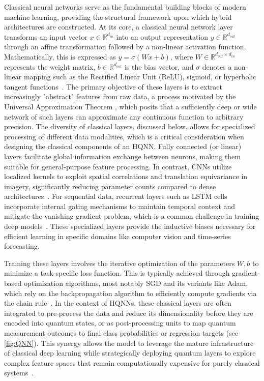 \documentclass[aps,10pt,groupedaddress,prx,superscriptaddress,twocolumn,balancelastpage, tightenlines]{revtex4-2}
\theoremstyle{plain}  %
\begin{document}
Classical neural networks serve as the fundamental building blocks of modern machine learning, providing the structural framework upon which hybrid architectures are constructed. At its core, a classical neural network layer transforms an input vector $x \in \mathbb{R}^{d_{in}}$ into an output representation $y \in \mathbb{R}^{d_{out}}$ through an affine transformation followed by a non-linear activation function. Mathematically, this is expressed as $y = \sigma(Wx + b)$, where $W \in \mathbb{R}^{d_{out} \times d_{in}}$ represents the weight matrix, $b \in \mathbb{R}^{d_{out}}$ is the bias vector, and $\sigma$ denotes a non-linear mapping such as the Rectified Linear Unit (ReLU), sigmoid, or hyperbolic tangent functions~\cite{goodfellow2016deep}. 
The primary objective of these layers is to extract increasingly "abstract" features from raw data, a process motivated by the Universal Approximation Theorem \cite{hornik1989multilayer}, which posits that a sufficiently deep or wide network of such layers can approximate any continuous function to arbitrary precision. The diversity of classical layers, discussed below, allows for specialized processing of different data modalities, which is a critical consideration when designing the classical components of an HQNN. Fully connected (or linear) layers facilitate global information exchange between neurons, making them suitable for general-purpose feature processing. In contrast, \glspl{CNN} utilize localized kernels to exploit spatial correlations and translation equivariance in imagery, significantly reducing parameter counts compared to dense architectures~\cite{lecun1998mnist, he2016resnet}. For sequential data, recurrent layers such as \gls{LSTM} cells incorporate internal gating mechanisms to maintain temporal context and mitigate the vanishing gradient problem, which is a common challenge in training deep models~\cite{hochreiter1997lstm}. These specialized layers provide the inductive biases necessary for efficient learning in specific domains like computer vision and time-series forecasting.



Training these layers involves the iterative optimization of the parameters $W, b$ to minimize a task-specific loss function. This is typically achieved through gradient-based optimization algorithms, most notably \gls{SGD} and its variants like Adam, which rely on the backpropagation algorithm to efficiently compute gradients via the chain rule~\cite{goodfellow2016deep}. In the context of HQNNs, these classical layers are often integrated to pre-process the data and reduce its dimensionality before they are encoded into quantum states, or as post-processing units to map quantum measurement outcomes to final class probabilities or regression targets (see \autoref{fig:QNN}). This synergy allows the model to leverage the mature infrastructure of classical deep learning while strategically deploying quantum layers to explore complex feature spaces that remain computationally expensive for purely classical systems~\cite{Schuld_2021_Effect, Benedetti_2019_Parameterized}.
\end{document}
